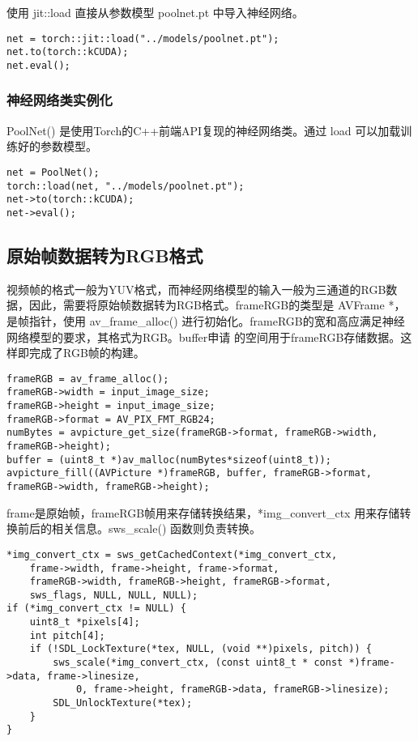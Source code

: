 使用 jit::load 直接从参数模型 poolnet.pt 中导入神经网络。

\begin{lstlisting}
net = torch::jit::load("../models/poolnet.pt");
net.to(torch::kCUDA);
net.eval();
\end{lstlisting}

\subsubsection{神经网络类实例化}

PoolNet() 是使用Torch的C++前端API复现的神经网络类。通过 load 可以加载训练好的参数模型。

\begin{lstlisting}
net = PoolNet();
torch::load(net, "../models/poolnet.pt");
net->to(torch::kCUDA);
net->eval();
\end{lstlisting}

\subsection{原始帧数据转为RGB格式}

视频帧的格式一般为YUV格式，而神经网络模型的输入一般为三通道的RGB数据，因此，需要将原始帧数据转为RGB格式。frameRGB的类型是
AVFrame *，是帧指针，使用 av\_frame\_alloc() 进行初始化。frameRGB的宽和高应满足神经网络模型的要求，其格式为RGB。buffer申请
的空间用于frameRGB存储数据。这样即完成了RGB帧的构建。

\begin{lstlisting}
frameRGB = av_frame_alloc();
frameRGB->width = input_image_size;
frameRGB->height = input_image_size;
frameRGB->format = AV_PIX_FMT_RGB24;
numBytes = avpicture_get_size(frameRGB->format, frameRGB->width, frameRGB->height);
buffer = (uint8_t *)av_malloc(numBytes*sizeof(uint8_t));
avpicture_fill((AVPicture *)frameRGB, buffer, frameRGB->format, frameRGB->width, frameRGB->height);
\end{lstlisting}

frame是原始帧，frameRGB帧用来存储转换结果，*img\_convert\_ctx 用来存储转换前后的相关信息。sws\_scale() 函数则负责转换。

\begin{lstlisting}
*img_convert_ctx = sws_getCachedContext(*img_convert_ctx,
    frame->width, frame->height, frame->format, 
    frameRGB->width, frameRGB->height, frameRGB->format, 
    sws_flags, NULL, NULL, NULL);
if (*img_convert_ctx != NULL) {
    uint8_t *pixels[4];
    int pitch[4];
    if (!SDL_LockTexture(*tex, NULL, (void **)pixels, pitch)) {
        sws_scale(*img_convert_ctx, (const uint8_t * const *)frame->data, frame->linesize,
            0, frame->height, frameRGB->data, frameRGB->linesize);
        SDL_UnlockTexture(*tex);
    }
}
\end{lstlisting}

